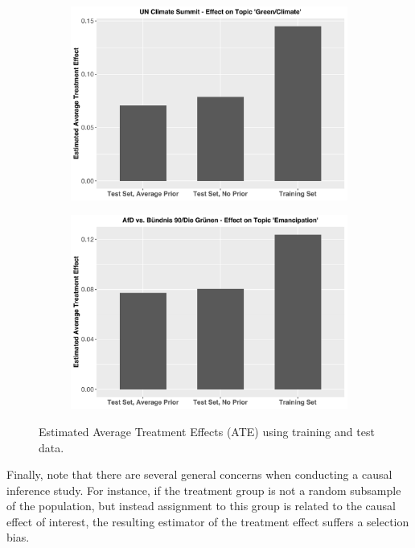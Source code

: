 \begin{figure}[h!]
  \centering
  \captionsetup{justification=centering,margin=2cm}
  \begin{subfigure}[b]{0.49\linewidth}
    \includegraphics[width=\linewidth]{../plots/4_7/climate_summit_ate.pdf}
  \end{subfigure}
  \begin{subfigure}[b]{0.49\linewidth}
    \includegraphics[width=\linewidth]{../plots/4_7/emancipation_ate.pdf}
  \end{subfigure}
  \caption{Estimated Average Treatment Effects (ATE) using training and test data.}
  \label{fig:causal_inference_ate}
\end{figure}

Finally, note that there are several general concerns when conducting a causal inference study. For instance, if the treatment group is not a random subsample of the population, but instead assignment to this group is related to the causal effect of interest, the resulting estimator of the treatment effect suffers a selection bias.